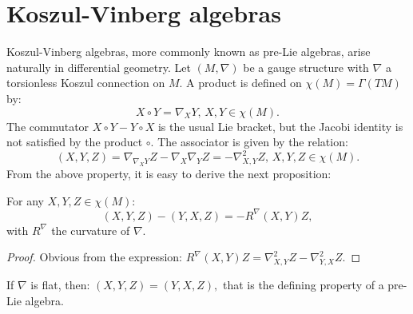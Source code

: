 \section{Koszul-Vinberg algebras}
Koszul-Vinberg algebras, more commonly known as pre-Lie algebras, 
arise naturally in differential geometry. Let $\left(M ,\nabla \right)$ be a gauge structure with $\nabla$ a torsionless Koszul connection on $M$. A product is defined on $\chi\left(M\right)=\Gamma\left(TM \right)$ by:
\begin{equation}
    \label{eq:example_kv}
    X \circ Y = \nabla_X Y, \, X,Y \in \chi\left(M\right).
\end{equation}
The commutator $X\circ Y - Y \circ X$ is the usual Lie bracket, but the Jacobi identity is not satisfied by the product $\circ$. The associator is given by the relation:
\begin{equation}
    \label{eq:associator_nabla}
    \left( X, Y, Z \right) = \nabla_{\nabla_X Y} Z - \nabla_X \nabla_Y Z = - \nabla^2_{X,Y}Z, \, X, Y, Z \in \chi\left(M\right).
\end{equation}
From the above property, it is easy to derive the next proposition:
\begin{prop}
\label{prop:kv_defect}
For any $X,Y,Z \in \chi\left(M\right):$
\begin{equation}
\label{eq:kv_defect}
    \left( X, Y, Z \right) - \left( Y, X, Z \right) = - R^\nabla\left( X, Y \right) Z,
\end{equation}
with $R^\nabla$ the curvature of $\nabla.$
\end{prop}
\begin{proof}
Obvious from the expression: $R^\nabla\left( X, Y \right) Z = \nabla^2_{X,Y}Z - \nabla^2_{Y,X}Z.$
\end{proof}
If $\nabla$ is flat, then:
$\left( X, Y , Z \right) = \left( Y, X, Z \right),$ that is the defining property of a pre-Lie algebra.
